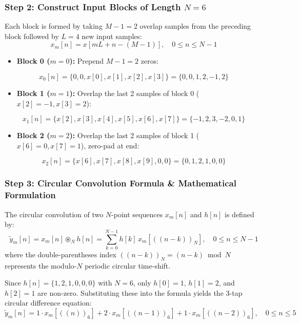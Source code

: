 \documentclass[11pt,a4paper]{article}
\begin{document}
\subsubsection*{Step 2: Construct Input Blocks of Length $N = 6$}
Each block is formed by taking $M - 1 = 2$ overlap samples from the preceding block followed by $L = 4$ new input samples:
$$ x_m[n] = x[mL + n - (M - 1)], \quad 0 \le n \le N - 1 $$

\begin{itemize}
\item \textbf{Block 0 ($m = 0$):} Prepend $M - 1 = 2$ zeros:
\end{itemize}
  $$ x_0[n] = \{ 0, 0, x[0], x[1], x[2], x[3] \} = \{ 0, 0, 1, 2, -1, 2 \} $$
\begin{itemize}
\item \textbf{Block 1 ($m = 1$):} Overlap the last 2 samples of block 0 ($x[2] = -1, x[3] = 2$):
\end{itemize}
  $$ x_1[n] = \{ x[2], x[3], x[4], x[5], x[6], x[7] \} = \{ -1, 2, 3, -2, 0, 1 \} $$
\begin{itemize}
\item \textbf{Block 2 ($m = 2$):} Overlap the last 2 samples of block 1 ($x[6] = 0, x[7] = 1$), zero-pad at end:
\end{itemize}
  $$ x_2[n] = \{ x[6], x[7], x[8], x[9], 0, 0 \} = \{ 0, 1, 2, 1, 0, 0 \} $$

\subsubsection*{Step 3: Circular Convolution Formula \& Mathematical Formulation}
The circular convolution of two $N$-point sequences $x_m[n]$ and $h[n]$ is defined by:
$$ \tilde{y}_m[n] = x_m[n] \circledast_N h[n] = \sum_{k=0}^{N-1} h[k] \, x_m[((n - k))_N], \quad 0 \le n \le N - 1 $$
where the double-parentheses index $((n - k))_N = (n - k) \bmod N$ represents the modulo-$N$ periodic circular time-shift.

Since $h[n] = \{1, 2, 1, 0, 0, 0\}$ with $N = 6$, only $h[0] = 1$, $h[1] = 2$, and $h[2] = 1$ are non-zero. Substituting these into the formula yields the 3-tap circular difference equation:
$$ \tilde{y}_m[n] = 1 \cdot x_m[((n))_6] + 2 \cdot x_m[((n - 1))_6] + 1 \cdot x_m[((n - 2))_6], \quad 0 \le n \le 5 $$
\end{document}
